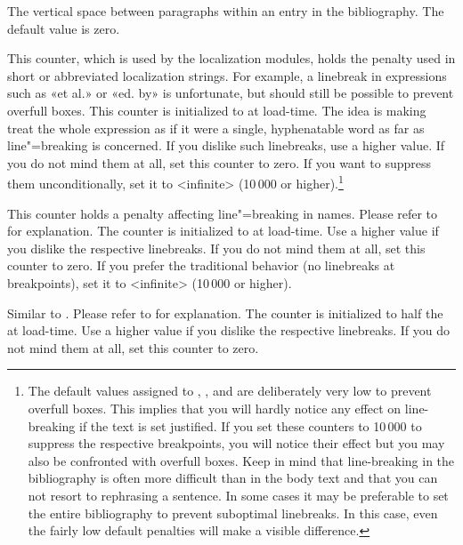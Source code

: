 \documentclass{ltxdockit}[2011/03/25]
\begin{document}
\begin{ltxsyntax}

The vertical space between paragraphs within an entry in the bibliography. The default value is zero.


This counter, which is used by the localization modules, holds the penalty used in short or abbreviated localization strings. For example, a linebreak in expressions such as «et al.» or «ed. by» is unfortunate, but should still be possible to prevent overfull boxes. This counter is initialized to  at load-time. The idea is making \tex treat the whole expression as if it were a single, hyphenatable word as far as line"=breaking is concerned. If you dislike such linebreaks, use a higher value. If you do not mind them at all, set this counter to zero. If you want to suppress them unconditionally, set it to <infinite> (10\,000 or higher).\footnote{The default values assigned to , , and  are deliberately very low to prevent overfull boxes. This implies that you will hardly notice any effect on line-breaking if the text is set justified. If you set these counters to 10\,000 to suppress the respective breakpoints, you will notice their effect but you may also be confronted with overfull boxes. Keep in mind that line-breaking in the bibliography is often more difficult than in the body text and that you can not resort to rephrasing a sentence. In some cases it may be preferable to set the entire bibliography  to prevent suboptimal linebreaks. In this case, even the fairly low default penalties will make a visible difference.}


This counter holds a penalty affecting line"=breaking in names. Please refer to  for explanation. The counter is initialized to  at load-time. Use a higher value if you dislike the respective linebreaks. If you do not mind them at all, set this counter to zero. If you prefer the traditional \bibtex behavior (no linebreaks at  breakpoints), set it to <infinite> (10\,000 or higher).


Similar to . Please refer to  for explanation. The counter is initialized to half the  at load-time. Use a higher value if you dislike the respective linebreaks. If you do not mind them at all, set this counter to zero.

\end{ltxsyntax}
\end{document}
